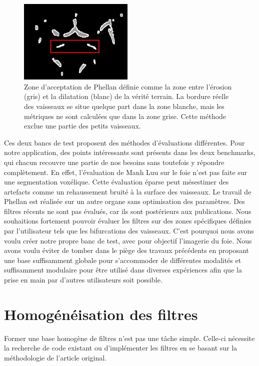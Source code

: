 \begin{figure}[h]
  \centering
  \includegraphics[height=4cm]{Images/Phellan_comparison.jpg}
  \caption{Zone d'acceptation de Phellan définie comme la zone entre l'érosion (gris) et la dilatation (blanc) de la vérité terrain. La bordure réelle des vaisseaux se situe quelque part dans la zone blanche, mais les métriques ne sont calculées que dans la zone grise. Cette méthode exclue une partie des petits vaisseaux.}
  \label{fig:Phellan_acceptance_zone}
\end{figure}

Ces deux bancs de test proposent des méthodes d'évaluations différentes. Pour notre application, des points intéressants sont présents dans les deux benchmarks, qui chacun recouvre une partie de nos besoins sans toutefois y répondre complètement. En effet, l'évaluation de Manh Luu sur le foie n'est pas faite sur une segmentation voxélique. Cette évaluation éparse peut mésestimer des artefacts comme un rehaussement bruité à la surface des vaisseaux. Le travail de Phellan est réalisée sur un autre organe sans optimisation des paramètres. Des filtres récents ne sont pas évalués, car ils sont postérieurs aux publications. Nous souhaitions fortement pouvoir évaluer les filtres sur des zones spécifiques définies par l'utilisateur tels que les bifurcations des vaisseaux. C'est pourquoi nous avons voulu créer notre propre banc de test, avec pour objectif l'imagerie du foie. Nous avons voulu éviter de tomber dans le piège des travaux précédents en proposant une base suffisamment globale pour s'accommoder de différentes modalités et suffisamment modulaire pour être utilisé dans diverses expériences afin que la prise en main par d'autres utilisateurs soit possible.

\section{Homogénéisation des filtres}
\label{sec:Filtres}

Former une base homogène de filtres n'est pas une tâche simple. Celle-ci nécessite la recherche de code existant ou d'implémenter les filtres en se basant sur la méthodologie de l'article original.

